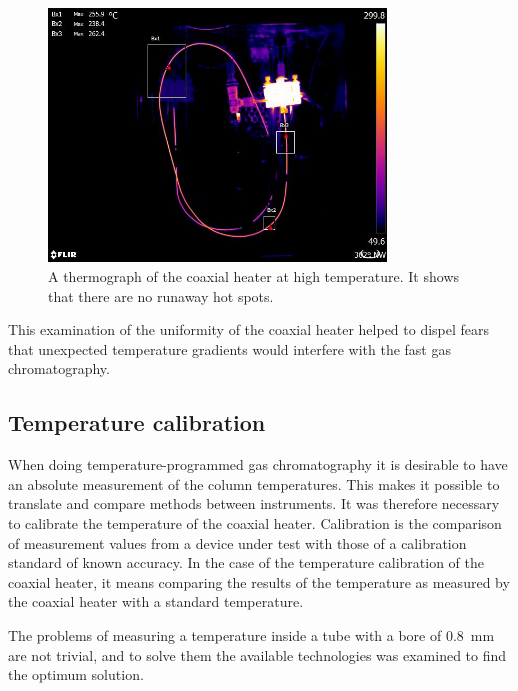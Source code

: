 \begin{figure}
	\centering
	\includegraphics[width=0.8\textwidth]{Figures/ThermalImage}
	\decoRule
	
\caption[A thermograph of the coaxial heater at temperature]{A thermograph of
the coaxial heater at high temperature. It shows that there are no runaway hot
spots.}
	
	\label{fig:ThermalImage}
\end{figure}

This examination of the uniformity of the coaxial heater helped to dispel fears
that unexpected temperature gradients would interfere with the fast gas
chromatography. 

\subsection{Temperature calibration}

When doing temperature-programmed gas chromatography it is desirable to have an
absolute measurement of the column temperatures. This makes it possible to
translate and compare methods between instruments. It was therefore necessary to
calibrate the temperature of the coaxial heater. Calibration is the comparison
of measurement values from a device under test with those of a calibration
standard of known accuracy. In the case of the temperature calibration of the
coaxial heater, it means comparing the results of the temperature as measured by
the coaxial heater with a standard temperature.

The problems of measuring a temperature inside a tube with a bore of
\SI{0.8}{\milli\metre} are not trivial, and to solve them the
available technologies was examined to find the optimum solution.

